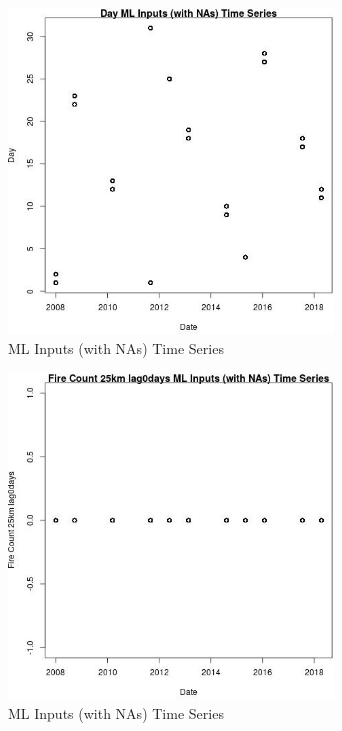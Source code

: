 \begin{figure} 
\centering  
\includegraphics[width=0.77\textwidth]{Code_Outputs/Report_ML_input_PM25_Step4_part_e_de_duplicated_aves_compiled_2019-05-18wNAs_DayvDate.jpg} 
\caption{\label{fig:Report_ML_input_PM25_Step4_part_e_de_duplicated_aves_compiled_2019-05-18wNAsDayvDate}ML Inputs (with NAs) Time Series} 
\end{figure} 
 

\begin{figure} 
\centering  
\includegraphics[width=0.77\textwidth]{Code_Outputs/Report_ML_input_PM25_Step4_part_e_de_duplicated_aves_compiled_2019-05-18wNAs_Fire_Count_25km_lag0daysvDate.jpg} 
\caption{\label{fig:Report_ML_input_PM25_Step4_part_e_de_duplicated_aves_compiled_2019-05-18wNAsFire_Count_25km_lag0daysvDate}ML Inputs (with NAs) Time Series} 
\end{figure} 
 

